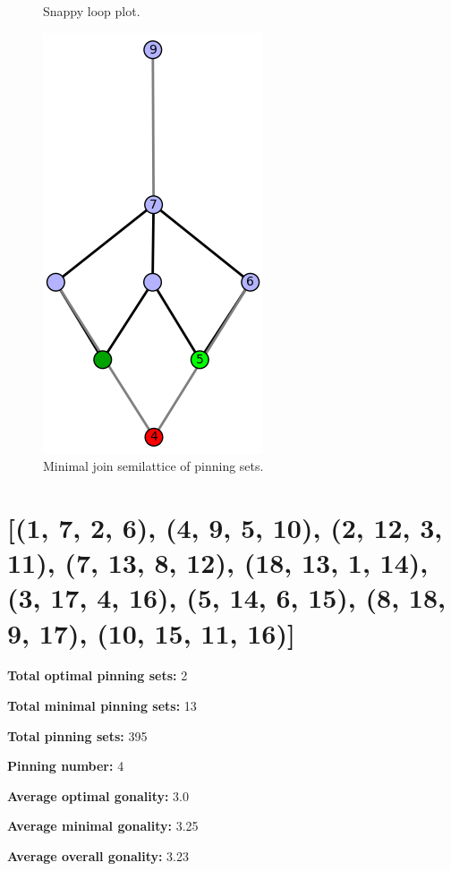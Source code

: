 \documentclass{article}%
\begin{document}
\newpage

\begin{multicols}{2}
\begin{figure}[H]
\centering
\def\svgscale{0.7}

\caption{Snappy loop plot.}
\label{fig:tex/img/7_6.svg}
\end{figure}
\columnbreak

\begin{figure}[H]
\centering
\includegraphics[scale=.9]{tex/img/7_6.png}
\caption{Minimal join semilattice of pinning sets.}
\label{fig:tex/img/7_6.png}
\end{figure}
\end{multicols}

\newpage

\section{[(1, 7, 2, 6), (4, 9, 5, 10), (2, 12, 3, 11), (7, 13, 8, 12), (18, 13, 1, 14), (3, 17, 4, 16), (5, 14, 6, 15), (8, 18, 9, 17), (10, 15, 11, 16)]}

\begin{multicols}{2}
{\normalsize \noindent\textbf{Total optimal pinning sets:} 2

\noindent\textbf{Total minimal pinning sets:} 13

\noindent\textbf{Total pinning sets:} 395

\noindent\textbf{Pinning number:} 4

}
\columnbreak

{\normalsize \noindent\textbf{Average optimal gonality:} 3.0

\noindent\textbf{Average minimal gonality:} 3.25

\noindent\textbf{Average overall gonality:} 3.23

}
\end{multicols}
\end{document}
